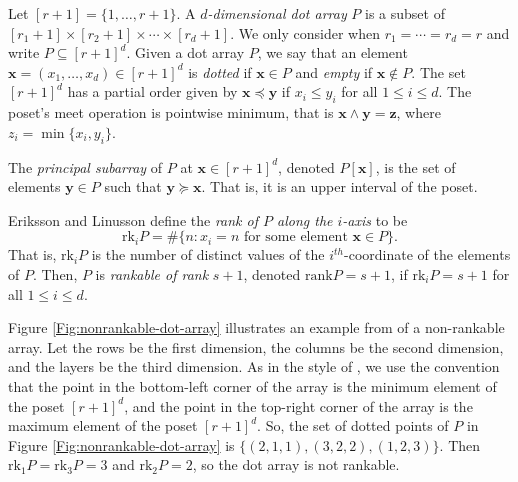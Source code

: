 \documentclass{amsart}
\begin{document}
	Let $[r+1] = \{ 1, \ldots, r+1 \}$. A \textit{$d$-dimensional dot array} $P$ is a subset of $[r_1 + 1] \times [r_2 + 1] \times \cdots \times [r_d + 1]$. We only consider when $r_1 = \cdots = r_d = r$ and write $P \subseteq [r+1]^d$. Given a dot array $P$, we say that an element $\mathbf{x} = (x_1, \ldots, x_d) \in [r+1]^d$ is \textit{dotted} if $\mathbf{x} \in P$ and \textit{empty} if $\mathbf{x} \not \in P$. The set $[r+1]^d$ has a partial order given by $\mathbf{x} \preceq \mathbf{y}$ if $x_i \leq y_i$ for all $1 \leq i \leq d$. The poset's meet operation is pointwise minimum, that is $\mathbf{x} \wedge \mathbf{y} = \mathbf{z}$, where $z_i = \min \{ x_i, y_i \}$.
	
	The \textit{principal subarray} of $P$ at $\mathbf{x} \in [r+1]^d$, denoted $P[\mathbf{x}]$, is the set of elements $\mathbf{y} \in P$ such that $\mathbf{y} \succeq \mathbf{x}$. That is, it is an upper interval of the poset.
	
	Eriksson and Linusson define the \textit{rank of $P$ along the $i$-axis} to be $$\mathrm{rk}_{i}P = \#\{ n : x_i = n \text{ for some element $\mathbf{x} \in P$} \}.$$ That is, $\mathrm{rk}_{i}P$ is the number of distinct values of the $i^{th}$-coordinate of the elements of $P$. Then, $P$ is \textit{rankable of rank} $s+1$, denoted $\mathrm{rank}P = s+1$, if $\mathrm{rk}_{i}P = s+1$ for all $1 \leq i \leq d$.
	
	Figure \ref{Fig:nonrankable-dot-array} illustrates an example from \cite[Section~2]{eriksson2000combinatorial} of a non-rankable array. Let the rows be the first dimension, the columns be the second dimension, and the layers be the third dimension. As in the style of \cite{amini2022limit}, we use the convention that the point in the bottom-left corner of the array is the minimum element of the poset $[r+1]^d$, and the point in the top-right corner of the array is the maximum element of the poset $[r+1]^d$. So, the set of dotted points of $P$ in Figure \ref{Fig:nonrankable-dot-array} is $\{ (2,1,1), (3,2,2), (1,2,3) \}$. Then $\mathrm{rk}_{1}P = \mathrm{rk}_3 P = 3$ and $\mathrm{rk}_2 P = 2$, so the dot array is not rankable.
	
\end{document}
